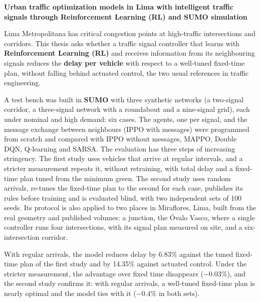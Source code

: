 
\begin{center}
\large \vspace{-1.5cm} \textbf{Urban traffic optimization models in Lima with intelligent traffic signals through Reinforcement Learning (RL) and SUMO simulation}
\end{center}

Lima Metropolitana has critical congestion points at high-traffic intersections and corridors. This thesis asks whether a traffic signal controller that learns with \textbf{Reinforcement Learning (RL)} and receives information from its neighbouring signals reduces the \textbf{delay per vehicle} with respect to a well-tuned fixed-time plan, without falling behind actuated control, the two usual references in traffic engineering.

A test bench was built in \textbf{SUMO} with three synthetic networks (a two-signal corridor, a three-signal network with a roundabout and a nine-signal grid), each under nominal and high demand: six cases. The agents, one per signal, and the message exchange between neighbours (IPPO with messages) were programmed from scratch and compared with IPPO without messages, MAPPO, Double DQN, Q-learning and SARSA. The evaluation has three steps of increasing stringency. The first study uses vehicles that arrive at regular intervals, and a stricter measurement repeats it, without retraining, with total delay and a fixed-time plan tuned from the minimum green. The second study uses random arrivals, re-tunes the fixed-time plan to the second for each case, publishes its rules before training and is evaluated blind, with two independent sets of 100 seeds. Its protocol is also applied to two places in Miraflores, Lima, built from the real geometry and published volumes: a junction, the Óvalo Vasco, where a single controller runs four intersections, with its signal plan measured on site, and a six-intersection corridor.

With regular arrivals, the model reduces delay by 6.83\% against the tuned fixed-time plan of the first study and by 14.35\% against actuated control. Under the stricter measurement, the advantage over fixed time disappears ($-0.03$\%), and the second study confirms it: with regular arrivals, a well-tuned fixed-time plan is nearly optimal and the model ties with it ($-0.4$\% in both sets).


